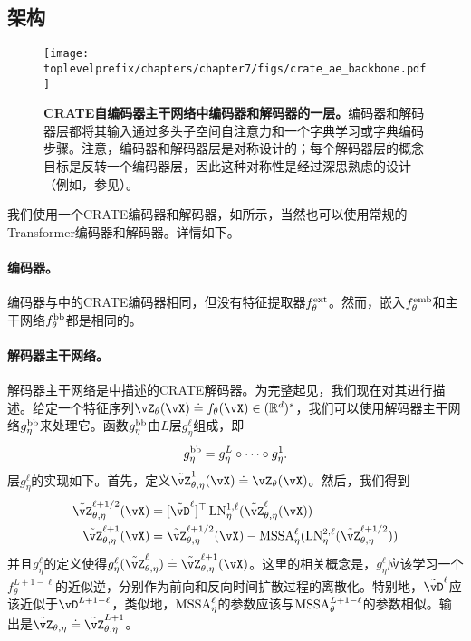 \documentclass[../../book-main_zh.tex]{subfiles}
\begin{document}
\subsection{架构}\label{sub:image_completion_architecture}

\begin{figure}
    \centering 
    \texttt{[image: \\toplevelprefix/chapters/chapter7/figs/crate\_ae\_backbone.pdf]}
    \caption{\small\textbf{CRATE自编码器主干网络中编码器和解码器的一层。}编码器和解码器层都将其输入通过多头子空间自注意力和一个字典学习或字典编码步骤。注意，编码器和解码器层是对称设计的；每个解码器层的概念目标是反转一个编码器层，因此这种对称性是经过深思熟虑的设计（例如，参见）。}
\end{figure}

我们使用一个CRATE编码器和解码器，如所示，当然也可以使用常规的Transformer编码器和解码器。详情如下。

\paragraph{编码器。} 编码器与中的CRATE编码器相同，但没有特征提取器\(f_{\theta}^{\mathrm{ext}}\)。然而，嵌入\(f_{\theta}^{\mathrm{emb}}\)和主干网络\(f_{\theta}^{\mathrm{bb}}\)都是相同的。

\paragraph{解码器主干网络。} 解码器主干网络是中描述的CRATE解码器。为完整起见，我们现在对其进行描述。给定一个特征序列\(\vZ_{\theta}(\vX) \doteq f_{\theta}(\vX) \in (\R^{d})^{*}\)，我们可以使用解码器主干网络\(g_{\eta}^{\mathrm{bb}}\)来处理它。函数\(g_{\eta}^{\mathrm{bb}}\)由\(L\)层\(g_{\eta}^{\ell}\)组成，即
\begin{equation}
    g_{\eta}^{\mathrm{bb}} = g_{\eta}^{L} \circ \cdots \circ g_{\eta}^{1}.
\end{equation}
层\(g_{\eta}^{\ell}\)的实现如下。首先，定义\(\tilde{\vZ}_{\theta, \eta}^{1}(\vX) \doteq \vZ_{\theta}(\vX)\)。然后，我们得到
\begin{align}
    \tilde{\vZ}_{\theta, \eta}^{\ell + 1/2}(\vX) 
    &= [\tilde{\vD}^{\ell}]^{\top}\LN_{\eta}^{1, \ell}(\tilde{\vZ}_{\theta, \eta}^{\ell}(\vX)) \\ 
    \tilde{\vZ}_{\theta, \eta}^{\ell + 1}(\vX)
    &= \tilde{\vZ}_{\theta, \eta}^{\ell + 1/2}(\vX) - \MSSA_{\eta}^{\ell}(\LN_{\eta}^{2, \ell}(\tilde{\vZ}_{\theta, \eta}^{\ell + 1/2}))
\end{align}
并且\(g_{\eta}^{\ell}\)的定义使得\(g_{\eta}^{\ell}(\tilde{\vZ}_{\theta, \eta}^{\ell}) \doteq \tilde{\vZ}_{\theta, \eta}^{\ell + 1}(\vX)\)。这里的相关概念是，\(g_{\eta}^{\ell}\)应该学习一个\(f_{\theta}^{L + 1 - \ell}\)的近似逆，分别作为前向和反向时间扩散过程的离散化。特别地，\(\tilde{\vD}^{\ell}\)应该近似于\(\vD^{L + 1 - \ell}\)，类似地，\(\operatorname{MSSA}_{\eta}^{\ell}\)的参数应该与\(\operatorname{MSSA}_{\theta}^{L + 1 - \ell}\)的参数相似。输出是\(\tilde{\vZ}_{\theta, \eta} \doteq \tilde{\vZ}_{\theta, \eta}^{L + 1}\)。
\end{document}

